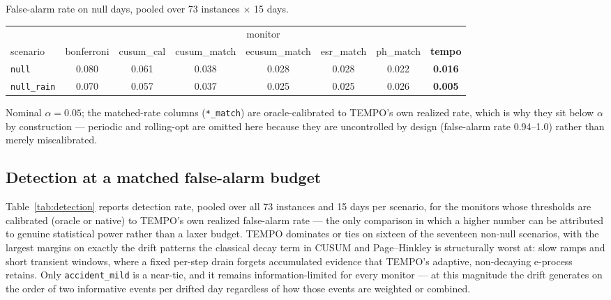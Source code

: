 \documentclass[trsc,dblanonrev]{informs4}
\begin{document}
\begin{table}
\TABLE
{False-alarm rate on null days, pooled over 73 instances $\times$ 15
days.\label{tab:validity}}
{\footnotesize\begin{tabular}{@{}lccccccc@{}}
\toprule
& \multicolumn{7}{c}{monitor} \\
\cmidrule(l){2-8}
scenario & bonferroni & cusum\_cal & cusum\_match & ecusum\_match &
esr\_match & ph\_match & \textbf{tempo} \\
\midrule
\texttt{null}      & 0.080 & 0.061 & 0.038 & 0.028 & 0.028 & 0.022 &
\textbf{0.016} \\
\texttt{null\_rain} & 0.070 & 0.057 & 0.037 & 0.025 & 0.025 & 0.026 &
\textbf{0.005} \\
\bottomrule
\end{tabular}}
{Nominal $\alpha = 0.05$; the matched-rate columns (\texttt{*\_match})
are oracle-calibrated to TEMPO's own realized rate, which is why they
sit below $\alpha$ by construction --- periodic and rolling-opt are
omitted here because they are uncontrolled by design (false-alarm rate
0.94--1.0) rather than merely miscalibrated.}
\end{table}

\subsection{Detection at a matched false-alarm budget}

Table~\ref{tab:detection} reports detection rate, pooled over all 73
instances and 15 days per scenario, for the monitors whose thresholds
are calibrated (oracle or native) to TEMPO's own realized false-alarm
rate --- the only comparison in which a higher number can be attributed
to genuine statistical power rather than a laxer budget. TEMPO
dominates or ties on sixteen of the seventeen non-null scenarios, with
the largest margins on exactly the drift patterns the classical decay
term in CUSUM and Page--Hinkley is structurally worst at: slow ramps
and short transient windows, where a fixed per-step drain forgets
accumulated evidence that TEMPO's adaptive, non-decaying e-process
retains. Only \texttt{accident\_mild} is a near-tie, and it remains
information-limited for every monitor --- at this magnitude the drift
generates on the order of two informative events per drifted day
regardless of how those events are weighted or combined.
\end{document}
